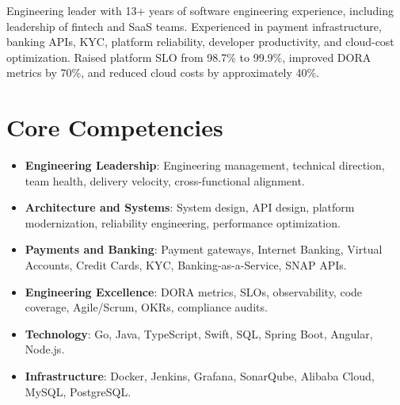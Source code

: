 \documentclass[11pt,a4paper,sans]{moderncv}
\begin{document}
\makecvtitle
\vspace{4pt}
\small{Engineering leader with 13+ years of software engineering experience, including leadership of fintech and SaaS teams. Experienced in payment infrastructure, banking APIs, KYC, platform reliability, developer productivity, and cloud-cost optimization. Raised platform SLO from 98.7\% to 99.9\%, improved DORA metrics by 70\%, and reduced cloud costs by approximately 40\%.}
\section{Core Competencies}
\begin{itemize}
\item \textbf{Engineering Leadership}: Engineering management, technical direction, team health, delivery velocity, cross-functional alignment.
\item \textbf{Architecture and Systems}: System design, API design, platform modernization, reliability engineering, performance optimization.
\item \textbf{Payments and Banking}: Payment gateways, Internet Banking, Virtual Accounts, Credit Cards, KYC, Banking-as-a-Service, SNAP APIs.
\item \textbf{Engineering Excellence}: DORA metrics, SLOs, observability, code coverage, Agile/Scrum, OKRs, compliance audits.
\item \textbf{Technology}: Go, Java, TypeScript, Swift, SQL, Spring Boot, Angular, Node.js.
\item \textbf{Infrastructure}: Docker, Jenkins, Grafana, SonarQube, Alibaba Cloud, MySQL, PostgreSQL.
\end{itemize}
\end{document}
